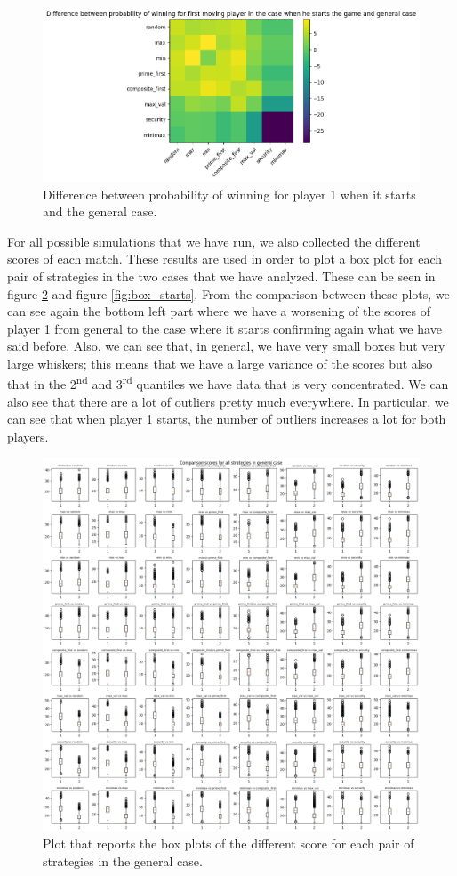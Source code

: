 \begin{figure}
    \centering
    \includegraphics[width=0.7\linewidth]{img/diff_prob.png}
    \caption{Difference between probability of winning for player 1 when it starts and the general case.}
    \label{fig:diff_prob}
\end{figure}

For all possible simulations that we have run, we also collected the different scores of each match. These results are used in order to plot a box plot for each pair of strategies in the two cases that we have analyzed. These can be seen in figure \ref{fig:box_general} and figure \ref{fig:box_starts}.
From the comparison between these plots, we can see again the bottom left part where we have a worsening of the scores of player 1 from general to the case where it starts confirming again what we have said before. 
Also, we can see that, in general, we have very small boxes but very large whiskers; this means that we have a large variance of the scores but also that in the 2\textsuperscript{nd} and 3\textsuperscript{rd} quantiles we have data that is very concentrated. We can also see that there are a lot of outliers pretty much everywhere. In particular, we can see that when player 1 starts, the number of outliers increases a lot for both players.

\begin{figure}
    \centering
    \includegraphics[width=0.7\linewidth]{img/box_plot_general.png}
    \caption{Plot that reports the box plots of the different score for each pair of strategies in the general case.}
    \label{fig:box_general}
\end{figure}

